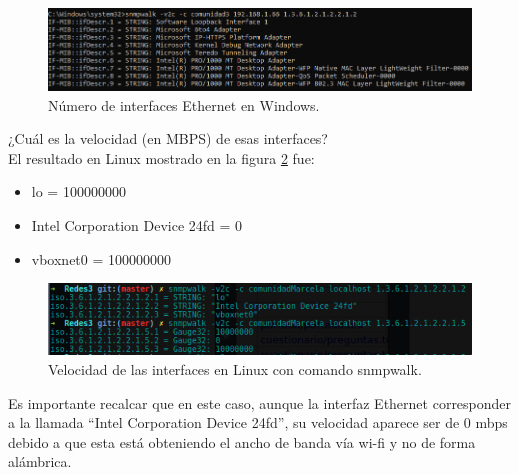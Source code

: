 \FloatBarrier
\begin{figure}[htbp!]
		\centering
			\includegraphics[width=.9 \textwidth]{images/windows2}
		\caption{Número de interfaces Ethernet en Windows.}
		\label{image:interfacesw}
\end{figure}
\FloatBarrier

\item ¿Cuál es la velocidad (en MBPS) de esas interfaces?
\\ El resultado en Linux mostrado en la figura \ref{image:velocidadInterfaces} fue:
\begin{itemize}
\item lo = 100000000
\item Intel Corporation Device 24fd = 0 
\item vboxnet0 = 100000000
\end{itemize}

\FloatBarrier
\begin{figure}[htbp!]
		\centering
			\includegraphics[width=.9 \textwidth]{images/Pregunta3L}
		\caption{Velocidad de las interfaces en Linux con comando snmpwalk.}
		\label{image:velocidadInterfaces}
\end{figure}
\FloatBarrier
Es importante recalcar que en este caso, aunque la interfaz Ethernet corresponder a la llamada ``Intel Corporation Device 24fd'', su velocidad aparece ser de 0 mbps debido a que esta está obteniendo el ancho de banda vía wi-fi y no de forma alámbrica.


